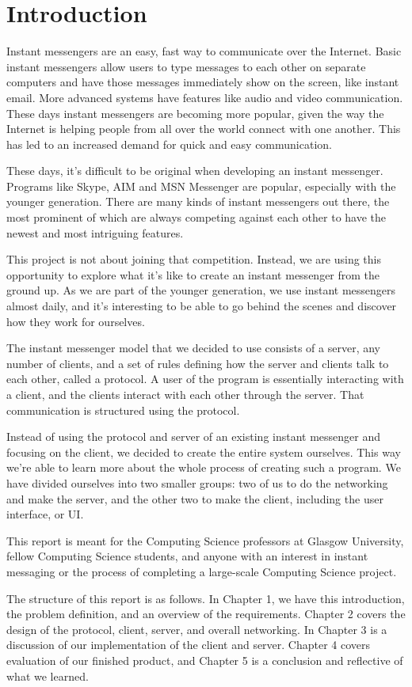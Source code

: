 \section{Introduction}

Instant messengers are an easy, fast way to communicate over the Internet. Basic instant messengers allow users to type messages to each other on separate computers and have those messages immediately show on the screen, like instant email. More advanced systems have features like audio and video communication. These days instant messengers are becoming more popular, given the way the Internet is helping people from all over the world connect with one another. This has led to an increased demand for quick and easy communication.

These days, it's difficult to be original when developing an instant messenger. Programs like Skype, AIM and MSN Messenger are popular, especially with the younger generation. There are many kinds of instant messengers out there, the most prominent of which are always competing against each other to have the newest and most intriguing features.

This project is not about joining that competition. Instead, we are using this opportunity to explore what it's like to create an instant messenger from the ground up. As we are part of the younger generation, we use instant messengers almost daily, and it's interesting to be able to go behind the scenes and discover how they work for ourselves.

The instant messenger model that we decided to use consists of a server, any number of clients, and a set of rules defining how the server and clients talk to each other, called a protocol. A user of the program is essentially interacting with a client, and the clients interact with each other through the server. That communication is structured using the protocol.

Instead of using the protocol and server of an existing instant messenger and focusing on the client, we decided to create the entire system ourselves. This way we're able to learn more about the whole process of creating such a program. We have divided ourselves into two smaller groups: two of us to do the networking and make the server, and the other two to make the client, including the user interface, or UI.

This report is meant for the Computing Science professors at Glasgow University, fellow Computing Science students, and anyone with an interest in instant messaging or the process of completing a large-scale Computing Science project.

The structure of this report is as follows. In Chapter 1, we have this introduction, the problem definition, and an overview of the requirements. Chapter 2 covers the design of the protocol, client, server, and overall networking. In Chapter 3 is a discussion of our implementation of the client and server. Chapter 4 covers evaluation of our finished product, and Chapter 5 is a conclusion and reflective of what we learned.
